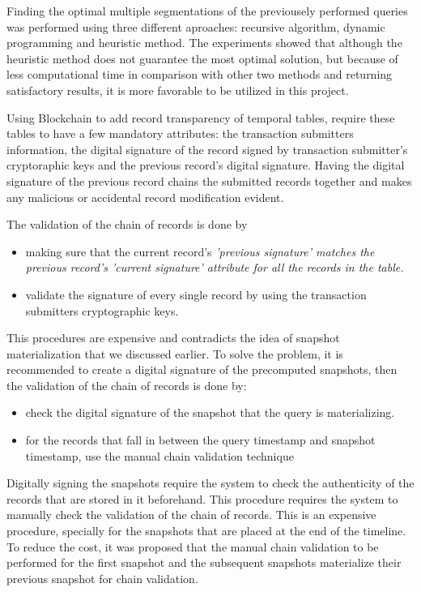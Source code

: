 		Finding the optimal multiple segmentations of the previousely performed queries was performed using three different aproaches: recursive algorithm, dynamic programming and heuristic method. The experiments showed that although the heuristic method does not guarantee the most optimal solution, but because of less computational time in comparison with other two methods and returning satisfactory results, it is more favorable to be utilized in this project.

		Using Blockchain to add record transparency of temporal tables, require these tables to have a few mandatory attributes: the transaction submitters information, the digital signature of the record signed by transaction submitter's cryptoraphic keys and the previous record's digital signature. Having the digital signature of the previous record chains the submitted records together and makes any malicious or accidental record modification evident.

		The validation of the chain of records is done by
		\begin{itemize}
			\item making sure that the current record's \it{'previous signature'} matches the previous record's \it{'current signature'} attribute for all the records in the table.
			\item validate the signature of every single record by using the transaction submitters cryptographic keys.
		\end{itemize}
		
		This procedures are expensive and contradicts the idea of snapshot materialization that we discussed earlier. To solve the problem, it is recommended to create a digital signature of the precomputed snapshots, then the validation of the chain of records is done by:
		\begin{itemize}
			\item check the digital signature of the snapshot that the query is materializing.
			\item for the records that fall in between the query timestamp and snapshot timestamp, use the manual chain validation technique
		\end{itemize}

		Digitally signing the snapshots require the system to check the authenticity of the records that are stored in it beforehand. This procedure requires the system to manually check the validation of the chain of records. This is an expensive procedure, specially for the snapshots that are placed at the end of the timeline. To reduce the cost, it was proposed that the manual chain validation to be performed for the first snapshot and the subsequent snapshots materialize their previous snapshot for chain validation.

